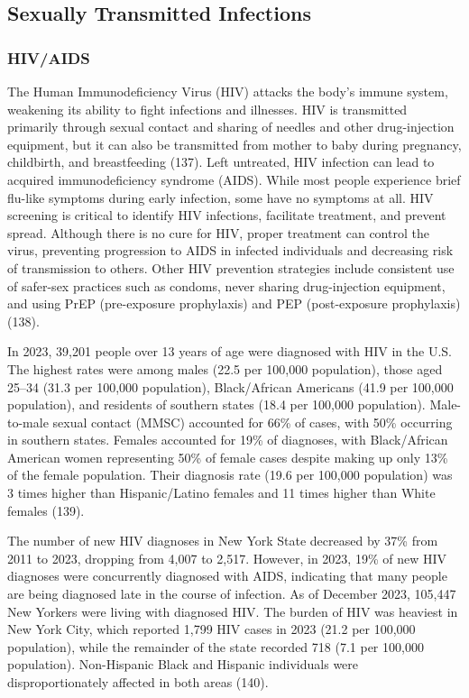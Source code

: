 \documentclass[
  english,
  letterpaper,
]{report}
\begin{document}
\subsection{Sexually Transmitted
Infections}\label{sexually-transmitted-infections}

\subsubsection{HIV/AIDS}\label{hivaids}

The Human Immunodeficiency Virus (HIV) attacks the body's immune system,
weakening its ability to fight infections and illnesses. HIV is
transmitted primarily through sexual contact and sharing of needles and
other drug-injection equipment, but it can also be transmitted from
mother to baby during pregnancy, childbirth, and breastfeeding (137).
Left untreated, HIV infection can lead to acquired immunodeficiency
syndrome (AIDS). While most people experience brief flu-like symptoms
during early infection, some have no symptoms at all. HIV screening is
critical to identify HIV infections, facilitate treatment, and prevent
spread. Although there is no cure for HIV, proper treatment can control
the virus, preventing progression to AIDS in infected individuals and
decreasing risk of transmission to others. Other HIV prevention
strategies include consistent use of safer-sex practices such as
condoms, never sharing drug-injection equipment, and using PrEP
(pre-exposure prophylaxis) and PEP (post-exposure prophylaxis) (138).

In 2023, 39,201 people over 13 years of age were diagnosed with HIV in
the U.S. The highest rates were among males (22.5 per 100,000
population), those aged 25--34 (31.3 per 100,000 population),
Black/African Americans (41.9 per 100,000 population), and residents of
southern states (18.4 per 100,000 population). Male-to-male sexual
contact (MMSC) accounted for 66\% of cases, with 50\% occurring in
southern states. Females accounted for 19\% of diagnoses, with
Black/African American women representing 50\% of female cases despite
making up only 13\% of the female population. Their diagnosis rate (19.6
per 100,000 population) was 3 times higher than Hispanic/Latino females
and 11 times higher than White females (139).

The number of new HIV diagnoses in New York State decreased by 37\% from
2011 to 2023, dropping from 4,007 to 2,517. However, in 2023, 19\% of
new HIV diagnoses were concurrently diagnosed with AIDS, indicating that
many people are being diagnosed late in the course of infection. As of
December 2023, 105,447 New Yorkers were living with diagnosed HIV. The
burden of HIV was heaviest in New York City, which reported 1,799 HIV
cases in 2023 (21.2 per 100,000 population), while the remainder of the
state recorded 718 (7.1 per 100,000 population). Non-Hispanic Black and
Hispanic individuals were disproportionately affected in both areas
(140).
\end{document}
